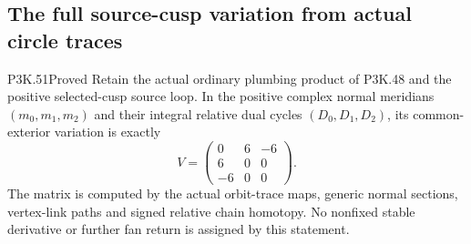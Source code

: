\subsection{The full source-cusp variation from actual circle traces}
\begin{statement}{P3K.51}{Proved}
Retain the actual ordinary plumbing product of P3K.48 and the
positive selected-cusp source loop. In the positive complex normal
meridians \((m_0,m_1,m_2)\) and their integral relative dual cycles
\((D_0,D_1,D_2)\), its common-exterior variation is exactly
\[
 V=\begin{pmatrix}0&6&-6\\6&0&0\\-6&0&0\end{pmatrix}.
\]
The matrix is computed by the actual orbit-trace maps, generic
normal sections, vertex-link paths and signed relative chain
homotopy. No nonfixed stable derivative or further fan return is
assigned by this statement.
\end{statement}
